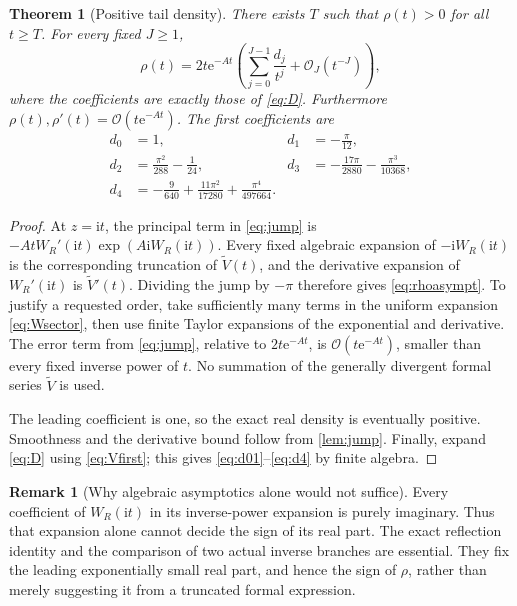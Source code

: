 \documentclass[11pt,a4paper]{article}
\newtheorem{theorem}{Theorem}[section]
\theoremstyle{definition}
\newtheorem{remark}[remark]{Remark}
\numberwithin{equation}{section}
\newcommand{\ii}{\mathrm{i}}
\newcommand{\ee}{\mathrm{e}}
\newcommand{\Oh}{\mathcal O}
\newcommand{\Vformal}{\widetilde V}
\begin{document}
\begin{theorem}[Positive tail density]
\label{thm:density}
There exists $T$ such that $\rho(t)>0$ for all $t\ge T$.
For every fixed $J\ge1$,
\begin{equation}
 \rho(t)=2t\ee^{-At}
 \left(\sum_{j=0}^{J-1}\frac{d_j}{t^j}+\Oh_J(t^{-J})\right),
 \label{eq:rhoasympt}
\end{equation}
where the coefficients are exactly those of \eqref{eq:D}.
Furthermore $\rho(t),\rho'(t)=\Oh(t\ee^{-At})$.
The first coefficients are
\begin{align}
 d_0&=1,&d_1&=-\frac\pi{12},\label{eq:d01}\\
 d_2&=\frac{\pi^2}{288}-\frac1{24},&
 d_3&=-\frac{17\pi}{2880}-\frac{\pi^3}{10368},\label{eq:d23}\\
 d_4&=-\frac9{640}+\frac{11\pi^2}{17280}
                         +\frac{\pi^4}{497664}.\label{eq:d4}
\end{align}
\end{theorem}
\begin{proof}
At $z=\ii t$, the principal term in \eqref{eq:jump} is
$-AtW_R'(\ii t)\exp(A\ii W_R(\ii t))$.
Every fixed algebraic expansion of $-\ii W_R(\ii t)$ is the corresponding
truncation of $\Vformal(t)$, and the derivative expansion of
$W_R'(\ii t)$ is $\Vformal'(t)$. Dividing the jump by $-\pi$ therefore gives
\eqref{eq:rhoasympt}. To justify a requested order, take sufficiently many
terms in the uniform expansion \eqref{eq:Wsector}, then use finite Taylor
expansions of the exponential and derivative. The error term from
\eqref{eq:jump}, relative to $2t\ee^{-At}$, is
$\Oh(t\ee^{-At})$, smaller than every fixed inverse power of $t$.
No summation of the generally divergent formal series $\Vformal$ is used.

The leading coefficient is one, so the exact real density is eventually
positive. Smoothness and the derivative bound follow from \cref{lem:jump}.
Finally, expand \eqref{eq:D} using \eqref{eq:Vfirst}; this gives
\eqref{eq:d01}--\eqref{eq:d4} by finite algebra.
\end{proof}

\begin{remark}[Why algebraic asymptotics alone would not suffice]
Every coefficient of $W_R(\ii t)$ in its inverse-power expansion is purely
imaginary. Thus that expansion alone cannot decide the sign of its real
part. The exact reflection identity and the comparison of two actual
inverse branches are essential. They fix the leading exponentially small
real part, and hence the sign of $\rho$, rather than merely suggesting it
from a truncated formal expression.
\end{remark}
\end{document}
